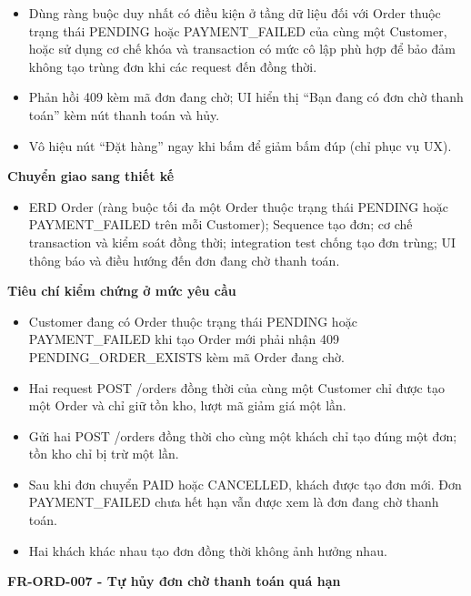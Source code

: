 \documentclass[11pt,a4paper,oneside]{report}
\begin{document}
\begin{itemize}
\item
  Dùng ràng buộc duy nhất có điều kiện ở tầng dữ liệu đối với Order thuộc trạng thái PENDING hoặc PAYMENT\_FAILED của cùng một Customer, hoặc sử dụng cơ chế khóa và transaction có mức cô lập phù hợp để bảo đảm không tạo trùng đơn khi các request đến đồng thời.
\item
  Phản hồi 409 kèm mã đơn đang chờ; UI hiển thị ``Bạn đang có đơn chờ thanh toán'' kèm nút thanh toán và hủy.
\item
  Vô hiệu nút ``Đặt hàng'' ngay khi bấm để giảm bấm đúp (chỉ phục vụ UX).
\end{itemize}

\textbf{Chuyển giao sang thiết kế}

\begin{itemize}
\item
  ERD Order (ràng buộc tối đa một Order thuộc trạng thái PENDING hoặc PAYMENT\_FAILED trên mỗi Customer); Sequence tạo đơn; cơ chế transaction và kiểm soát đồng thời; integration test chống tạo đơn trùng; UI thông báo và điều hướng đến đơn đang chờ thanh toán.
\end{itemize}

\textbf{Tiêu chí kiểm chứng ở mức yêu cầu}

\begin{itemize}
\item
  Customer đang có Order thuộc trạng thái PENDING hoặc PAYMENT\_FAILED khi tạo Order mới phải nhận 409 PENDING\_ORDER\_EXISTS kèm mã Order đang chờ.
\item
  Hai request POST /orders đồng thời của cùng một Customer chỉ được tạo một Order và chỉ giữ tồn kho, lượt mã giảm giá một lần.
\item
  Gửi hai POST /orders đồng thời cho cùng một khách chỉ tạo đúng một đơn; tồn kho chỉ bị trừ một lần.
\item
  Sau khi đơn chuyển PAID hoặc CANCELLED, khách được tạo đơn mới. Đơn PAYMENT\_FAILED chưa hết hạn vẫn được xem là đơn đang chờ thanh toán.
\item
  Hai khách khác nhau tạo đơn đồng thời không ảnh hưởng nhau.
\end{itemize}

\textbf{FR-ORD-007 - Tự hủy đơn chờ thanh toán quá hạn}
\end{document}
